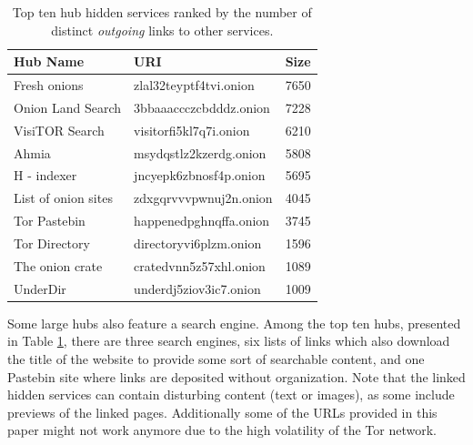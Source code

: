 \documentclass[USenglish,oneside,twocolumn]{article}
\begin{document}
\begin{table}[t]
    \caption{Top ten hub hidden services ranked by the number of distinct \emph{outgoing} links to other services.}
    \label{table:toptenout}
    \begin{tabular}{p{3cm} | p{3.5cm} | p{1cm}}
         \textbf{Hub Name} & \textbf{URI} & \textbf{Size} \\
         \hline
         \hline
        Fresh onions & zlal32teyptf4tvi.onion  &  7650\\
        \hline
        Onion Land Search & 3bbaaaccczcbdddz.onion  &  7228\\
        \hline
        VisiTOR Search & visitorfi5kl7q7i.onion  &  6210\\
        \hline
        Ahmia & msydqstlz2kzerdg.onion  &  5808\\
        \hline
        H - indexer & jncyepk6zbnosf4p.onion  &  5695\\
        \hline
        List of onion sites & zdxgqrvvvpwnuj2n.onion  &  4045\\
        \hline
        Tor Pastebin & happenedpghnqffa.onion  &  3745\\
        \hline
        Tor Directory & directoryvi6plzm.onion  &  1596\\
        \hline
        The onion crate & cratedvnn5z57xhl.onion  &  1089\\
        \hline
        UnderDir & underdj5ziov3ic7.onion  &  1009\\
    \end{tabular}
\end{table}

Some large hubs also feature a search engine. Among the top ten hubs, presented in Table \ref{table:toptenout}, there are three search engines, six lists of links which also download the title of the website to provide some sort of searchable content, and one Pastebin site where links are deposited without organization. Note that the linked hidden services can contain disturbing content (text or images), as some include previews of the linked pages. Additionally some of the URLs provided in this paper might not work anymore due to the high volatility of the Tor network. %
\end{document}
